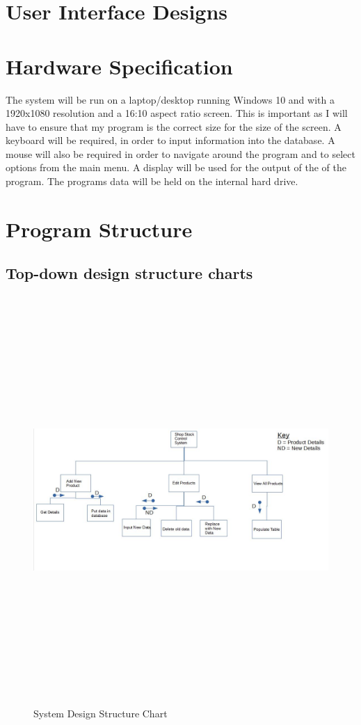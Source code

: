 \section{User Interface Designs}

\section{Hardware Specification}
The system will be run on a laptop/desktop running Windows 10 and with a 1920x1080 resolution and a 16:10 aspect ratio screen. This is important as I will have to ensure that my program is the correct size for the size of the screen. A keyboard will be required, in order to input information into the database. A mouse will also be required in order to navigate around the program and to select options from the main menu. A display will be used for the output of the of the program. The programs data will be held on the internal hard drive.
\section{Program Structure}

\subsection{Top-down design structure charts}

\begin{figure}[H]
	\centering
	\includegraphics[width= 20cm, height = 15.5cm]{Design/images/Hierarchy_Chart.JPG}
	\caption {System Design Structure Chart} \label{fig:system_design_structure_chart}
\end{figure}

